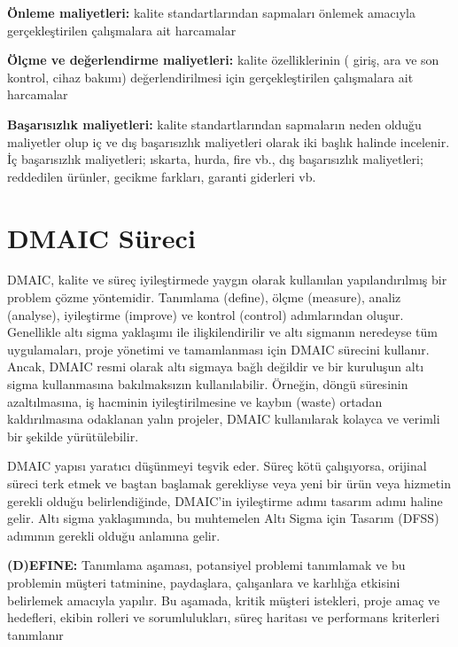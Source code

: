 \documentclass[
]{book}
\begin{document}
\textbf{Önleme maliyetleri:} kalite standartlarından sapmaları önlemek amacıyla gerçekleştirilen çalışmalara ait harcamalar

\textbf{Ölçme ve değerlendirme maliyetleri:} kalite özelliklerinin ( giriş, ara ve son kontrol, cihaz bakımı) değerlendirilmesi için gerçekleştirilen çalışmalara ait harcamalar

\textbf{Başarısızlık maliyetleri:} kalite standartlarından sapmaların neden olduğu maliyetler olup iç ve dış başarısızlık maliyetleri olarak iki başlık halinde incelenir. İç başarısızlık maliyetleri; ıskarta, hurda, fire vb., dış başarısızlık maliyetleri; reddedilen ürünler, gecikme farkları, garanti giderleri vb.

\hypertarget{dmaic-suxfcreci}{%
\chapter{DMAIC Süreci}\label{dmaic-suxfcreci}}

DMAIC, kalite ve süreç iyileştirmede yaygın olarak kullanılan yapılandırılmış bir problem çözme yöntemidir. Tanımlama (define), ölçme (measure), analiz (analyse), iyileştirme (improve) ve kontrol (control) adımlarından oluşur. Genellikle altı sigma yaklaşımı ile ilişkilendirilir ve altı sigmanın neredeyse tüm uygulamaları, proje yönetimi ve tamamlanması için DMAIC sürecini kullanır. Ancak, DMAIC resmi olarak altı sigmaya bağlı değildir ve bir kuruluşun altı sigma kullanmasına bakılmaksızın kullanılabilir. Örneğin, döngü süresinin azaltılmasına, iş hacminin iyileştirilmesine ve kaybın (waste) ortadan kaldırılmasına odaklanan yalın projeler, DMAIC kullanılarak kolayca ve verimli bir şekilde yürütülebilir.

DMAIC yapısı yaratıcı düşünmeyi teşvik eder. Süreç kötü çalışıyorsa, orijinal süreci terk etmek ve baştan başlamak gerekliyse veya yeni bir ürün veya hizmetin gerekli olduğu belirlendiğinde, DMAIC'in iyileştirme adımı tasarım adımı haline gelir. Altı sigma yaklaşımında, bu muhtemelen Altı Sigma için Tasarım (DFSS) adımının gerekli olduğu anlamına gelir.

\textbf{(D)EFINE:} Tanımlama aşaması, potansiyel problemi tanımlamak ve bu problemin müşteri tatminine, paydaşlara, çalışanlara ve karlılığa etkisini belirlemek amacıyla yapılır. Bu aşamada, kritik müşteri istekleri, proje amaç ve hedefleri, ekibin rolleri ve sorumlulukları, süreç haritası ve performans kriterleri tanımlanır
\end{document}
